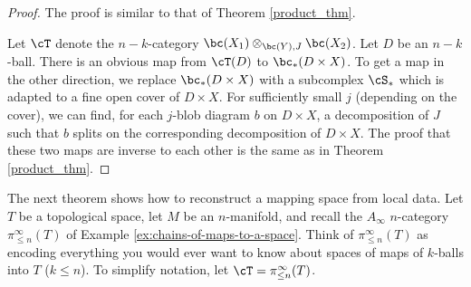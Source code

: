 \begin{proof}
The proof is similar to that of Theorem \ref{product_thm}.

Let $\cT$ denote the $n{-}k$-category $\bc(X_1) \otimes_{\bc(Y), J} \bc(X_2)$.
Let $D$ be an $n{-}k$-ball.
There is an obvious map from $\cT(D)$ to $\bc_*(D\times X)$.
To get a map in the other direction, we replace $\bc_*(D\times X)$ with a subcomplex
$\cS_*$ which is adapted to a fine open cover of $D\times X$.
For sufficiently small $j$ (depending on the cover), we can find, for each $j$-blob diagram $b$
on $D\times X$, a decomposition of $J$ such that $b$ splits on the corresponding
decomposition of $D\times X$.
The proof that these two maps are inverse to each other is the same as in
Theorem \ref{product_thm}.
\end{proof}


\medskip

The next theorem shows how to reconstruct a mapping space from local data.
Let $T$ be a topological space, let $M$ be an $n$-manifold, 
and recall the $A_\infty$ $n$-category $\pi^\infty_{\leq n}(T)$ 
of Example \ref{ex:chains-of-maps-to-a-space}.
Think of $\pi^\infty_{\leq n}(T)$ as encoding everything you would ever
want to know about spaces of maps of $k$-balls into $T$ ($k\le n$).
To simplify notation, let $\cT = \pi^\infty_{\leq n}(T)$.

